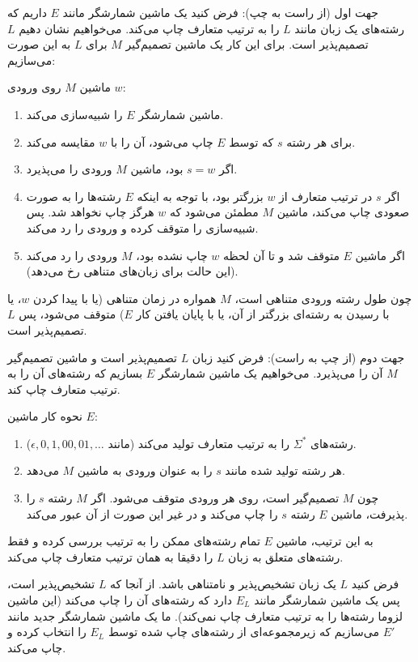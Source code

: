
{جهت اول (از راست به چپ):} فرض کنید یک ماشین شمارشگر مانند $E$ داریم که رشته‌های یک زبان مانند $L$ را به ترتیب متعارف چاپ می‌کند. می‌خواهیم نشان دهیم $L$ تصمیم‌پذیر است.
برای این کار یک ماشین تصمیم‌گیر $M$ برای $L$ به این صورت می‌سازیم:

ماشین $M$ روی ورودی $w$:
\begin{enumerate}
    \item ماشین شمارشگر $E$ را شبیه‌سازی می‌کند.
    \item برای هر رشته $s$ که توسط $E$ چاپ می‌شود، آن را با $w$ مقایسه می‌کند.
    \item اگر $s = w$ بود، ماشین $M$ ورودی را می‌پذیرد.
    \item اگر $s$ در ترتیب متعارف از $w$ بزرگتر بود، با توجه به اینکه $E$ رشته‌ها را به صورت صعودی چاپ می‌کند، ماشین $M$ مطمئن می‌شود که $w$ هرگز چاپ نخواهد شد. پس شبیه‌سازی را متوقف کرده و ورودی را رد می‌کند.
    \item اگر ماشین $E$ متوقف شد و تا آن لحظه $w$ چاپ نشده بود، $M$ ورودی را رد می‌کند (این حالت برای زبان‌های متناهی رخ می‌دهد).
\end{enumerate}
چون طول رشته ورودی متناهی است، $M$ همواره در زمان متناهی (یا با پیدا کردن $w$، یا با رسیدن به رشته‌ای بزرگتر از آن، یا با پایان یافتن کار $E$) متوقف می‌شود، پس $L$ تصمیم‌پذیر است.

{جهت دوم (از چپ به راست):} فرض کنید زبان $L$ تصمیم‌پذیر است و ماشین تصمیم‌گیر $M$ آن را می‌پذیرد. می‌خواهیم یک ماشین شمارشگر $E$ بسازیم که رشته‌های آن را به ترتیب متعارف چاپ کند.

نحوه کار ماشین $E$:
\begin{enumerate}
    \item رشته‌های $\Sigma^*$ را به ترتیب متعارف تولید می‌کند (مانند $\epsilon, 0, 1, 00, 01, \dots$).
    \item هر رشته تولید شده مانند $s$ را به عنوان ورودی به ماشین $M$ می‌دهد.
    \item چون $M$ تصمیم‌گیر است، روی هر ورودی متوقف می‌شود. اگر $M$ رشته $s$ را پذیرفت، ماشین $E$ رشته $s$ را چاپ می‌کند و در غیر این صورت از آن عبور می‌کند.
\end{enumerate}
به این ترتیب، ماشین $E$ تمام رشته‌های ممکن را به ترتیب بررسی کرده و فقط رشته‌های متعلق به زبان $L$ را دقیقا به همان ترتیب متعارف چاپ می‌کند.


فرض کنید $L$ یک زبان تشخیص‌پذیر و نامتناهی باشد. از آنجا که $L$ تشخیص‌پذیر است، پس یک ماشین شمارشگر مانند $E_L$ دارد که رشته‌های آن را چاپ می‌کند (این ماشین لزوما رشته‌ها را به ترتیب متعارف چاپ نمی‌کند).
ما یک ماشین شمارشگر جدید مانند $E'$ می‌سازیم که زیرمجموعه‌ای از رشته‌های چاپ شده توسط $E_L$ را انتخاب کرده و چاپ می‌کند.

